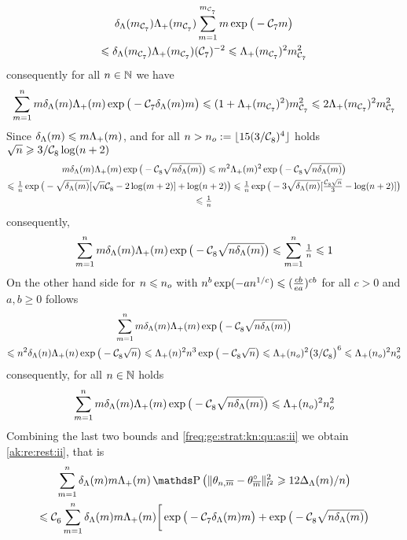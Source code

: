 \begin{pro}
\begin{multline*}
  \cmSv[\Di_{\cst{7}}]\miSv[\Di_{\cst{7}}]\sum_{\Di=1}^{\Di_{\cst{7}}}\Di\exp\big(-\cst{7}\Di\big)\\\leq
  \cmSv[\Di_{\cst{7}}]\miSv[\Di_{\cst{7}}](\cst{7})^{-2}\leq\miSv[\Di_{\cst{7}}]^2\Di_{\cst{7}}^2
\end{multline*}
consequently for all $\ssY\in\Nz$ we have
\begin{displaymath}
  \sum_{\Di=1}^{\ssY}\Di\cmSv\miSv\exp\big(-\cst{7}\cmSv\Di\big)\leq(1+\miSv[\Di_{\cst{7}}]^2)\Di_{\cst{7}}^2\leq 2\miSv[\Di_{\cst{7}}]^2\Di_{\cst{7}}^2
\end{displaymath}
Since  $\cmSv\leq\Di\miSv$,
and  for all $ \ssY>\ssY_{o}:=\floor{15({3/\cst{8}})^4}$ holds $\sqrt{\ssY}\geq{3/\cst{8}}\log(\ssY+2)$
\begin{multline*}
\Di\cmSv\miSv\exp\big(-\cst{8}\sqrt{\ssY\cmSv}\big)\leq
\Di^2\miSv^2\exp\big(-\cst{8}\sqrt{\ssY\cmSv}\big)\\\leq
\tfrac{1}{\ssY}\exp\big(-\sqrt{\cmSv}[\sqrt{\ssY}\cst{8}-2\log(\Di+2)]+\log(\ssY+2)\big)
\leq\tfrac{1}{\ssY}\exp\big(-3\sqrt{\cmSv}[\tfrac{\cst{8}\sqrt{\ssY}}{3}-\log(\ssY+2)]\big)
\\
\leq \tfrac{1}{\ssY}
  \end{multline*}
consequently, 
\begin{equation*}
\sum_{\Di=1}^{\ssY}\Di\cmSv\miSv\exp\big(-\cst{8}\sqrt{\ssY\cmSv}\big)\leq\sum_{\Di=1}^{\ssY}\tfrac{1}{\ssY}\leq1
\end{equation*}
On the other hand side for $\ssY\leq\ssY_{o}$ with  $\ssY^b\exp(-a\ssY^{1/c})\leq (\tfrac{cb}{ea})^{cb}$ for all $c>0$ and $a,b\geq0$  follows
\begin{multline*}
\sum_{\Di=1}^{\ssY}\Di\cmSv\miSv\exp\big(-\cst{8}\sqrt{\ssY\cmSv}\big)\\
\leq\ssY^2\cmSv[\ssY]\miSv[\ssY]\exp\big(-\cst{8}\sqrt{\ssY}\big)\leq
\miSv[\ssY]^2\ssY^3\exp\big(-\cst{8}\sqrt{\ssY}\big)\leq \miSv[\ssY_{o}]^2\big({3/\cst{8}}\big)^6\leq\miSv[\ssY_{o}]^2\ssY_{o}^2
\end{multline*}
 consequently, for all $\ssY\in\Nz$ holds
 \begin{displaymath}
 \sum_{\Di=1}^{\ssY}\Di\cmSv\miSv\exp\big(-\cst{8}\sqrt{\ssY\cmSv}\big)\leq \miSv[\ssY_{o}]^2\ssY_{o}^2
\end{displaymath}
Combining the last two bounds and  \ref{freq:ge:strat:kn:qu:as:ii} we obtain \ref{ak:re:rest:ii}, that is 
\begin{multline*}
\sum_{\Di=1}^{\ssY}\cmiSv \Di \miSv\P\big(\Vnormlp{\txdfPr[\Di]-\xdfPr[\Di]}^2\geq12\DipenSv/\ssY\big)\\\hfill\leq \cst{6}\sum_{\Di=1}^{\ssY}\cmiSv \Di \miSv\bigg[\exp\big(-\cst{7}\cmSv\Di\big)+\exp\big(-\cst{8}\sqrt{\ssY\cmSv}\big)

\end{multline*}
\end{pro}
